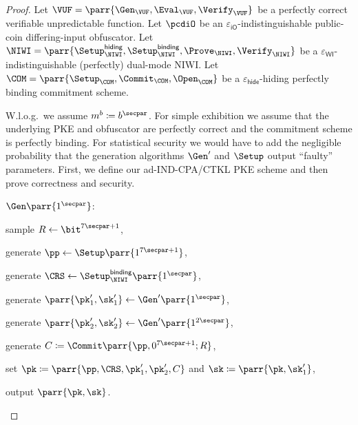\begin{proof}
    Let \(\VUF = \parr{\Gen_\VUF,\Eval_\VUF,\Verify_\VUF}\) be a perfectly correct verifiable unpredictable function.
    Let \(\pcdiO\) be an \(\varepsilon_{\textsf{iO}}\)-indistinguishable public-coin differing-input obfuscator.
    Let \(\NIWI = \parr{\Setup^{\textsf{hiding}}_\NIWI,\Setup^{\textsf{binding}}_\NIWI,\Prove_\NIWI,\Verify_\NIWI}\) be a \(\varepsilon_{\textsf{WI}}\)-indistinguishable (perfectly) dual-mode NIWI.
    Let \(\COM = \parr{\Setup_\COM,\Commit_\COM,\Open_\COM}\) be a \(\varepsilon_{\textsf{hide}}\)-hiding perfectly binding commitment scheme.

    W.l.o.g.\ we assume \(m^b \coloneqq b^\secpar\).
    For simple exhibition we assume that the underlying PKE and obfuscator are perfectly correct and the commitment scheme is perfectly binding.
    For statistical security we would have to add the negligible probability that the generation algorithms \(\Gen'\) and \(\Setup\) output \enquote{faulty} parameters.
    First, we define our ad-IND-CPA/CTKL PKE scheme and then prove correctness and security.
    \begin{sitemize}
        \item \(\Gen\parr{1^\secpar}\):
        \begin{sitemize}
            \item sample \(R \gets \bit^{7\secpar+1}\),
            \item generate \(\pp \gets \Setup\parr{1^{7\secpar+1}}\),
            \item generate \(\CRS \gets \Setup^{\textsf{binding}}_\NIWI\parr{1^\secpar}\),
            \item generate \(\parr{\pk'_1,\sk'_1} \gets \Gen'\parr{1^{\secpar}}\),
            \item generate \(\parr{\pk'_2,\sk'_2} \gets \Gen'\parr{1^{2\secpar}}\),
            \item generate \(C \coloneqq \Commit\parr{\pp,0^{7\secpar+1};R}\),
            \item set \(\pk \coloneqq \parr{\pp,\CRS,\pk'_1,\pk'_2,C}\) and \(\sk \coloneqq \parr{\pk,\sk'_1}\),
            \item output \(\parr{\pk,\sk}\).
        \end{sitemize}


\end{sitemize}
\end{proof}
